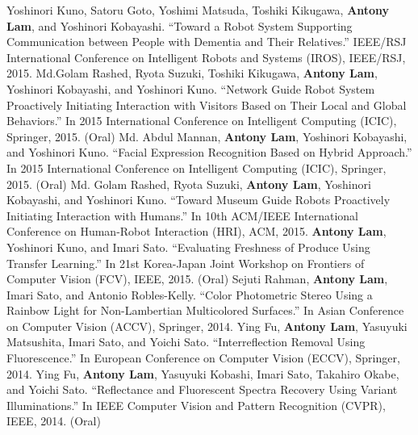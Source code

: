 \documentclass[letterpaper,10pt]{article}
\begin{document}
Yoshinori Kuno, Satoru Goto, Yoshimi Matsuda, Toshiki Kikugawa, \textbf{Antony Lam}, and Yoshinori Kobayashi. ``Toward a Robot System Supporting Communication between People with Dementia and Their Relatives.'' IEEE/RSJ International Conference on Intelligent Robots and Systems (IROS), IEEE/RSJ, 2015.\vspace{0.05in}\newline
Md.Golam Rashed, Ryota Suzuki, Toshiki Kikugawa, \textbf{Antony Lam}, Yoshinori Kobayashi, and Yoshinori Kuno. ``Network Guide Robot System Proactively Initiating Interaction with Visitors Based on Their Local and Global Behaviors.'' In 2015 International Conference on Intelligent Computing (ICIC), Springer, 2015. (Oral)\vspace{0.05in}\newline
Md. Abdul Mannan, \textbf{Antony Lam}, Yoshinori Kobayashi, and Yoshinori Kuno. ``Facial Expression Recognition Based on Hybrid Approach.'' In 2015 International Conference on Intelligent Computing (ICIC), Springer, 2015. (Oral)\vspace{0.05in}\newline
Md. Golam Rashed, Ryota Suzuki, \textbf{Antony Lam}, Yoshinori Kobayashi, and Yoshinori Kuno. ``Toward Museum Guide Robots Proactively Initiating Interaction with Humans.'' In 10th ACM/IEEE International Conference on Human-Robot Interaction (HRI), ACM, 2015.\vspace{0.05in}\newline
\textbf{Antony Lam}, Yoshinori Kuno, and Imari Sato. ``Evaluating Freshness of Produce Using Transfer Learning.'' In  21st Korea-Japan Joint Workshop on Frontiers of Computer Vision (FCV), IEEE, 2015. (Oral)
\vspace{0.05in}\newline
Sejuti Rahman, \textbf{Antony Lam}, Imari Sato, and Antonio Robles-Kelly. ``Color Photometric Stereo Using a Rainbow Light for Non-Lambertian Multicolored Surfaces.'' In Asian Conference on Computer Vision (ACCV), Springer, 2014.
\vspace{0.05in}\newline
Ying Fu, \textbf{Antony Lam}, Yasuyuki Matsushita, Imari Sato, and Yoichi Sato. ``Interreflection Removal Using Fluorescence.'' In European Conference on Computer Vision (ECCV), Springer, 2014.
\vspace{0.05in}\newline
Ying Fu, \textbf{Antony Lam}, Yasuyuki Kobashi, Imari Sato, Takahiro Okabe, and Yoichi Sato. ``Reflectance and Fluorescent Spectra Recovery Using Variant Illuminations.'' In IEEE Computer Vision and Pattern Recognition (CVPR), IEEE, 2014. (Oral)
\end{document}
